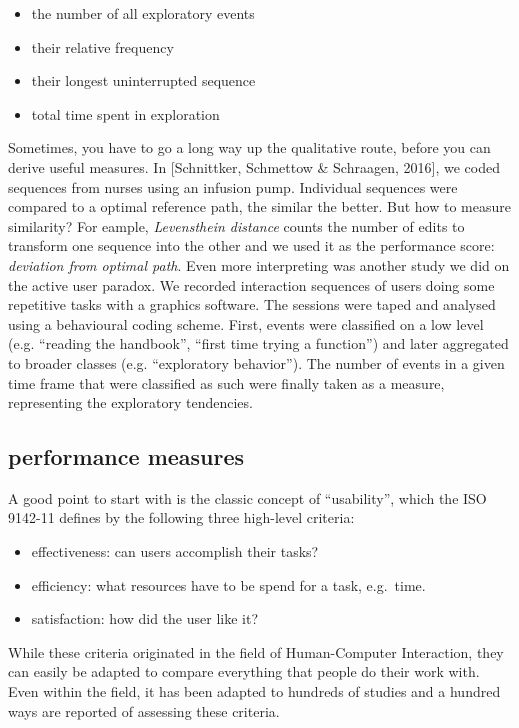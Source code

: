 \documentclass[]{svmono}
\providecommand{\tightlist}{%
  \setlength{\itemsep}{0pt}\setlength{\parskip}{0pt}}
\theoremstyle{definition}
\theoremstyle{definition}
\theoremstyle{definition}
\theoremstyle{remark}
\begin{document}
\begin{itemize}
\tightlist
\item
  the number of all exploratory events
\item
  their relative frequency
\item
  their longest uninterrupted sequence
\item
  total time spent in exploration
\end{itemize}

Sometimes, you have to go a long way up the qualitative route, before
you can derive useful measures. In {[}Schnittker, Schmettow \&
Schraagen, 2016{]}, we coded sequences from nurses using an infusion
pump. Individual sequences were compared to a optimal reference path,
the similar the better. But how to measure similarity? For eample,
\emph{Levensthein distance} counts the number of edits to transform one
sequence into the other and we used it as the performance score:
\emph{deviation from optimal path}. Even more interpreting was another
study we did on the active user paradox. We recorded interaction
sequences of users doing some repetitive tasks with a graphics software.
The sessions were taped and analysed using a behavioural coding scheme.
First, events were classified on a low level (e.g. ``reading the
handbook'', ``first time trying a function'') and later aggregated to
broader classes (e.g. ``exploratory behavior''). The number of events in
a given time frame that were classified as such were finally taken as a
measure, representing the exploratory tendencies.

\subsection{performance measures}\label{performance-measures}

A good point to start with is the classic concept of ``usability'',
which the ISO 9142-11 defines by the following three high-level
criteria:

\begin{itemize}
\tightlist
\item
  effectiveness: can users accomplish their tasks?
\item
  efficiency: what resources have to be spend for a task, e.g.~time.
\item
  satisfaction: how did the user like it?
\end{itemize}

While these criteria originated in the field of Human-Computer
Interaction, they can easily be adapted to compare everything that
people do their work with. Even within the field, it has been adapted to
hundreds of studies and a hundred ways are reported of assessing these
criteria.
\end{document}
